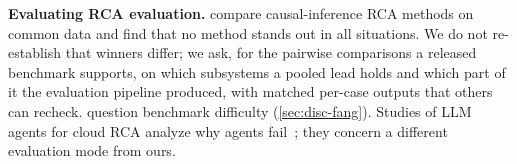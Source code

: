 \textbf{Evaluating RCA evaluation.}
\citet{pham2024howfar} compare causal-inference RCA methods on common data and find that no method stands out in all situations. We do not re-establish that winners differ; we ask, for the pairwise comparisons a released benchmark supports, on which subsystems a pooled lead holds and which part of it the evaluation pipeline produced, with matched per-case outputs that others can recheck.
\citet{fang2025simplerca} question benchmark difficulty (\cref{sec:disc-fang}).
Studies of LLM agents for cloud RCA analyze why agents fail~\citep{kim2026agentfail,riddell2026stalled}; they concern a different evaluation mode from ours.
